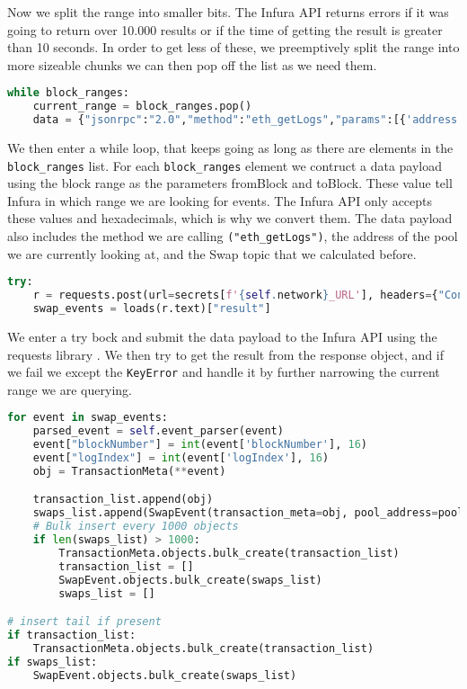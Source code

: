 Now we split the range into smaller bits. The Infura API returns errors if it was going to return over 10.000 results or if the time of getting the result is greater than 10 seconds. In order to get less of these, we preemptively split the range into more sizeable chunks we can then pop off the list as we need them.

\begin{lstlisting}[language=python]
while block_ranges:
    current_range = block_ranges.pop()
    data = {"jsonrpc":"2.0","method":"eth_getLogs","params":[{'address': pool.address , 'fromBlock': hex(int(current_range[0])), 'toBlock': hex(int(current_range[1])) , 'topics': [swap_topic]}],"id":1}
\end{lstlisting}

We then enter a while loop, that keeps going as long as there are elements in the \texttt{block\_ranges} list. For each \texttt{block\_ranges} element we contruct a data payload using the block range as the parameters fromBlock and toBlock. These value tell Infura in which range we are looking for events. The Infura API only accepts these values and hexadecimals, which is why we convert them. The data payload also includes the method we are calling \texttt{("eth\_getLogs")}, the address of the pool we are currently looking at, and the Swap topic that we calculated before.

\begin{lstlisting}[language=python]
try:
    r = requests.post(url=secrets[f'{self.network}_URL'], headers={"Content-Type": "application/json"}, data=dumps(data))
    swap_events = loads(r.text)["result"]
\end{lstlisting}

We enter a try bock and submit the data payload to the Infura API using the requests library \cite{requests}. We then try to get the result from the response object, and if we fail we except the \texttt{KeyError} and handle it by further narrowing the current range we are querying. 


\begin{lstlisting}[language=python]
for event in swap_events:
    parsed_event = self.event_parser(event)
    event["blockNumber"] = int(event['blockNumber'], 16)
    event["logIndex"] = int(event['logIndex'], 16)
    obj = TransactionMeta(**event)

    transaction_list.append(obj)
    swaps_list.append(SwapEvent(transaction_meta=obj, pool_address=pool, **parsed_event.args))
    # Bulk insert every 1000 objects
    if len(swaps_list) > 1000:
        TransactionMeta.objects.bulk_create(transaction_list)
        transaction_list = []
        SwapEvent.objects.bulk_create(swaps_list)
        swaps_list = []

# insert tail if present
if transaction_list:
    TransactionMeta.objects.bulk_create(transaction_list)
if swaps_list:
    SwapEvent.objects.bulk_create(swaps_list)
\end{lstlisting}


